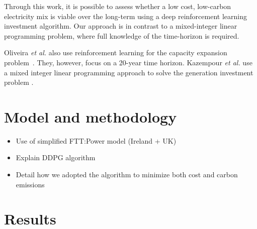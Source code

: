 \documentclass{article}
\begin{document}
Through this work, it is possible to assess whether a low cost, low-carbon electricity mix is viable over the long-term using a deep reinforcement learning investment algorithm. Our approach is in contrast to a mixed-integer linear programming problem, where full knowledge of the time-horizon is required.

Oliveira \textit{et al.} also use reinforcement learning for the capacity expansion problem~\cite{Oliveira2018}. They, however, focus on a 20-year time horizon. Kazempour \textit{et al.} use a mixed integer linear programming approach to solve the generation investment problem \cite{Kazempour2011}.






\section{Model and methodology}
\label{sec:methods}

\begin{itemize}
	\item Use of simplified FTT:Power model (Ireland + UK)
	\item Explain DDPG algorithm
	\item Detail how we adopted the algorithm to minimize both cost and carbon emissions
\end{itemize}



\section{Results}
\label{sec:results}
\end{document}
